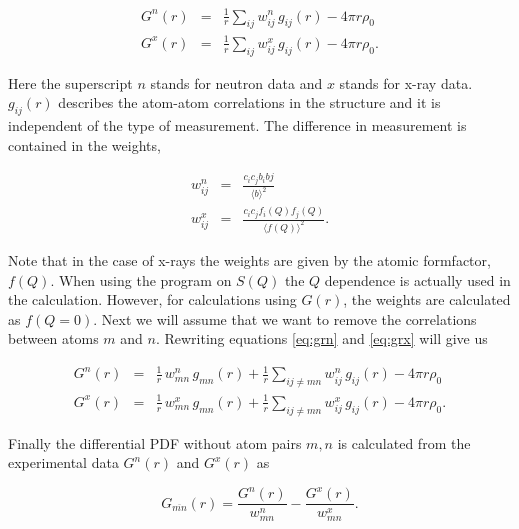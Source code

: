 \begin{eqnarray}
  G^{n}(r) & = & \frac{1}{r} \sum_{ij} w_{ij}^{n} \, g_{ij}(r) - 4 \pi r \rho_{0}
  \label{eq:grn}\\
  G^{x}(r) & = & \frac{1}{r} \sum_{ij} w_{ij}^{x} \, g_{ij}(r) - 4 \pi r \rho_{0}.
  \label{eq:grx}
\end{eqnarray}

\noindent Here the superscript $n$ stands for neutron data and $x$
stands for x-ray data. $g_{ij}(r)$ describes the atom-atom
correlations in the structure and it is independent of the type of
measurement. The difference in measurement is contained in the
weights,

\begin{eqnarray}
  w^{n}_{ij} & = & \frac{c_{i} c_{j} b_{i} b{j}}{\langle b \rangle ^{2}}
  \label{eq:wn}\\
  w^{x}_{ij} & = & \frac{c_{i} c_{j} f_{i}(Q) f_{j}(Q)}{\langle f(Q) \rangle
  ^{2}}.
  \label{eq:wx}
\end{eqnarray}

\noindent Note that in the case of x-rays the weights are given by
the atomic formfactor, $f(Q)$. When using the program on $S(Q)$ the
$Q$ dependence is actually used in the calculation. However, for
calculations using $G(r)$, the weights are calculated as $f(Q=0)$.
Next we will assume that we want to remove the correlations between
atoms $m$ and $n$. Rewriting equations \ref{eq:grn} and \ref{eq:grx}
will give us

\begin{eqnarray}
  G^{n}(r) & = & \frac{1}{r} \, w_{mn}^{n} \, g_{mn}(r) +
                 \frac{1}{r} \sum_{ij \neq mn} w_{ij}^{n} \, g_{ij}(r) - 4 \pi r \rho_{0}
  \label{eq:grn2}\\
  G^{x}(r) & = & \frac{1}{r} \, w_{mn}^{x} \, g_{mn}(r) +
                 \frac{1}{r} \sum_{ij \neq mn} w_{ij}^{x} \, g_{ij}(r) - 4 \pi r \rho_{0}.
  \label{eq:grx2}
\end{eqnarray}

\noindent Finally the differential PDF without atom pairs $m,n$ is
calculated from the experimental data $G^{n}(r)$ and $G^{x}(r)$ as

\begin{equation}
  G_{\overline{mn}}(r) = \frac{G^{n}(r)}{w^{n}_{mn}} -
                         \frac{G^{x}(r)}{w^{x}_{mn}}.
  \label{eq:gdiff}
\end{equation}

\newpage
